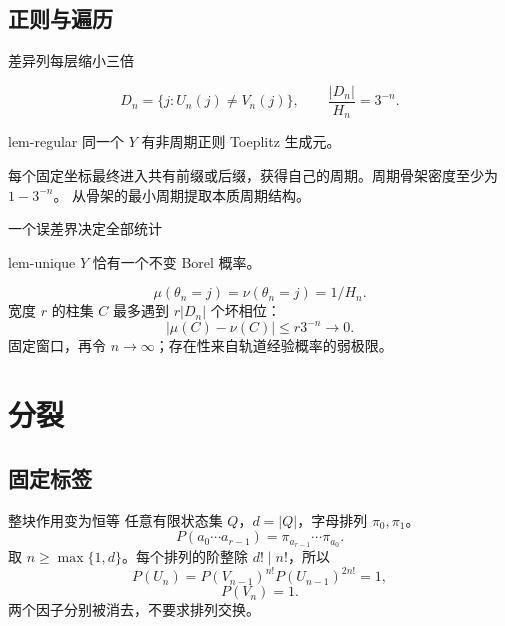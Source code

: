 \documentclass{beamer}
\begin{document}
\subsection{正则与遍历}

\begin{frame}{差异列每层缩小三倍}

\[
D_n=\{j:U_n(j)\ne V_n(j)\},\qquad \frac{|D_n|}{H_n}=3^{-n}.
\]
\begin{bookresult}{lem-regular}
同一个 $Y$ 有非周期正则 Toeplitz 生成元。
\end{bookresult}
每个固定坐标最终进入共有前缀或后缀，获得自己的周期。周期骨架密度至少为 $1-3^{-n}$。
\medskip
从骨架的最小周期提取本质周期结构。
\end{frame}

\begin{frame}{一个误差界决定全部统计}

\begin{bookresult}{lem-unique}
$Y$ 恰有一个不变 Borel 概率。
\end{bookresult}
\[
\mu(\theta_n=j)=\nu(\theta_n=j)=1/H_n.
\]
宽度 $r$ 的柱集 $C$ 最多遇到 $r|D_n|$ 个坏相位：
\[
|\mu(C)-\nu(C)|\leq r3^{-n}\longrightarrow0.
\]
固定窗口，再令 $n\to\infty$；存在性来自轨道经验概率的弱极限。
\end{frame}

\section{分裂}
\subsection{固定标签}

\begin{frame}{整块作用变为恒等}
任意有限状态集 $Q$，$d=|Q|$，字母排列 $\pi_0,\pi_1$。
\[
P(a_0\cdots a_{r-1})=\pi_{a_{r-1}}\cdots\pi_{a_0}.
\]
取 $n\geq\max\{1,d\}$。每个排列的阶整除 $d!\mid n!$，所以
\[
P(U_n)=P(V_{n-1})^{n!}P(U_{n-1})^{2n!}=1,
\]
\[
P(V_n)=1.
\]
两个因子分别被消去，不要求排列交换。
\end{frame}
\end{document}
